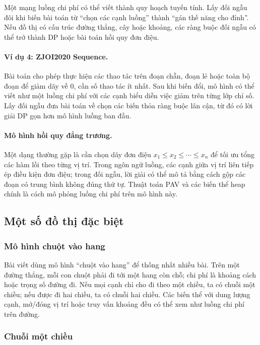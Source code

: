 \documentclass[11pt]{article}
\begin{document}
Một mạng luồng chi phí có thể viết thành quy hoạch tuyến tính. Lấy đối ngẫu đôi
khi biến bài toán từ ``chọn các cạnh luồng'' thành ``gán thế năng cho đỉnh''.
Nếu đồ thị có cấu trúc đường thẳng, cây hoặc khoảng, các ràng buộc đối ngẫu có
thể trở thành DP hoặc bài toán hồi quy đơn điệu.

\paragraph{Ví dụ 4: ZJOI2020 Sequence.}
Bài toán cho phép thực hiện các thao tác trên đoạn chẵn, đoạn lẻ hoặc toàn bộ
đoạn để giảm dãy về $0$, cần số thao tác ít nhất. Sau khi biến đổi, mô hình có
thể viết như một luồng chi phí với các cạnh biểu diễn việc giảm trên từng lớp
chỉ số. Lấy đối ngẫu đưa bài toán về chọn các biến thỏa ràng buộc lân cận, từ
đó có lời giải DP gọn hơn mô hình luồng ban đầu.

\paragraph{Mô hình hồi quy đẳng trương.}
Một dạng thường gặp là cần chọn dãy đơn điệu $x_1\le x_2\le\cdots\le x_n$ để
tối ưu tổng các hàm lồi theo từng vị trí. Trong ngôn ngữ luồng, các cạnh giữa
vị trí liên tiếp ép điều kiện đơn điệu; trong đối ngẫu, lời giải có thể mô tả
bằng cách gộp các đoạn có trung bình không đúng thứ tự. Thuật toán PAV và các
biến thể heap chính là cách mô phỏng luồng chi phí trên mô hình này.

\subsection{Một số đồ thị đặc biệt}

\subsubsection{Mô hình chuột vào hang}

Bài viết dùng mô hình ``chuột vào hang'' để thống nhất nhiều bài. Trên một đường
thẳng, mỗi con chuột phải đi tới một hang còn chỗ; chi phí là khoảng cách hoặc
trọng số đường đi. Nếu mọi cạnh chỉ cho đi theo một chiều, ta có chuỗi một
chiều; nếu được đi hai chiều, ta có chuỗi hai chiều. Các biến thể với dung lượng
cạnh, mở/đóng vị trí hoặc truy vấn khoảng đều có thể xem như luồng chi phí trên
đường.

\subsubsection{Chuỗi một chiều}
\end{document}
